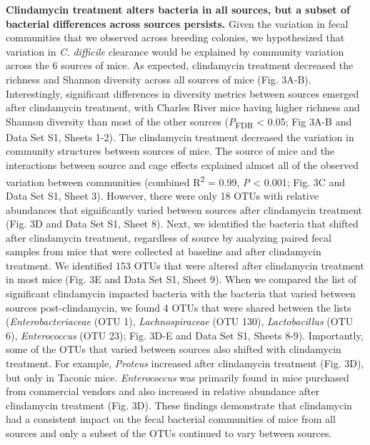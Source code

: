 \documentclass[
  11pt,
]{article}
\begin{document}
\textbf{Clindamycin treatment alters bacteria in all sources, but a
subset of bacterial differences across sources persists.} Given the
variation in fecal communities that we observed across breeding
colonies, we hypothesized that variation in \emph{C. difficile}
clearance would be explained by community variation across the 6 sources
of mice. As expected, clindamycin treatment decreased the richness and
Shannon diversity across all sources of mice (Fig. 3A-B). Interestingly,
significant differences in diversity metrics between sources emerged
after clindamycin treatment, with Charles River mice having higher
richness and Shannon diversity than most of the other sources
(\emph{P}\textsubscript{FDR} \textless{} 0.05; Fig 3A-B and Data Set S1,
Sheets 1-2). The clindamycin treatment decreased the variation in
community structures between sources of mice. The source of mice and the
interactions between source and cage effects explained almost all of the
observed variation between communities (combined R\textsuperscript{2} =
0.99, \emph{P} \textless{} 0.001; Fig. 3C and Data Set S1, Sheet 3).
However, there were only 18 OTUs with relative abundances that
significantly varied between sources after clindamycin treatment (Fig.
3D and Data Set S1, Sheet 8). Next, we identified the bacteria that
shifted after clindamycin treatment, regardless of source by analyzing
paired fecal samples from mice that were collected at baseline and after
clindamycin treatment. We identified 153 OTUs that were altered after
clindamycin treatment in most mice (Fig. 3E and Data Set S1, Sheet 9).
When we compared the list of significant clindamycin impacted bacteria
with the bacteria that varied between sources post-clindamycin, we found
4 OTUs that were shared between the lists (\emph{Enterobacteriaceae}
(OTU 1), \emph{Lachnospiraceae} (OTU 130), \emph{Lactobacillus} (OTU 6),
\emph{Enterococcus} (OTU 23); Fig. 3D-E and Data Set S1, Sheets 8-9).
Importantly, some of the OTUs that varied between sources also shifted
with clindamycin treatment. For example, \emph{Proteus} increased after
clindamycin treatment (Fig. 3D), but only in Taconic mice.
\emph{Enterococcus} was primarily found in mice purchased from
commercial vendors and also increased in relative abundance after
clindamycin treatment (Fig. 3D). These findings demonstrate that
clindamycin had a consistent impact on the fecal bacterial communities
of mice from all sources and only a subset of the OTUs continued to vary
between sources.
\end{document}
